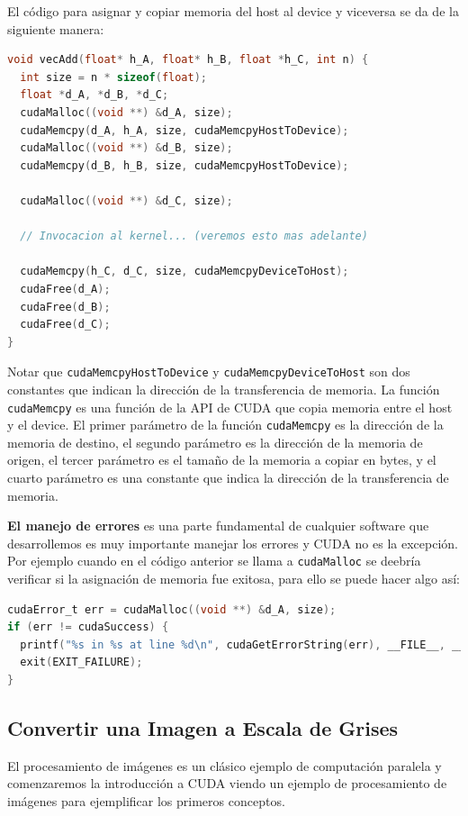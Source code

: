 El código para asignar y copiar memoria del host al device y viceversa se da de la siguiente manera:

\begin{lstlisting}[language=C]
void vecAdd(float* h_A, float* h_B, float *h_C, int n) {
  int size = n * sizeof(float);
  float *d_A, *d_B, *d_C;
  cudaMalloc((void **) &d_A, size);
  cudaMemcpy(d_A, h_A, size, cudaMemcpyHostToDevice);
  cudaMalloc((void **) &d_B, size);
  cudaMemcpy(d_B, h_B, size, cudaMemcpyHostToDevice);

  cudaMalloc((void **) &d_C, size);

  // Invocacion al kernel... (veremos esto mas adelante)

  cudaMemcpy(h_C, d_C, size, cudaMemcpyDeviceToHost);
  cudaFree(d_A);
  cudaFree(d_B);
  cudaFree(d_C);
}
\end{lstlisting}

Notar que \texttt{cudaMemcpyHostToDevice} y \texttt{cudaMemcpyDeviceToHost} son dos constantes que indican la dirección
de la transferencia de memoria. La función \texttt{cudaMemcpy} es una función de la API de CUDA que copia memoria entre
el host y el device. El primer parámetro de la función \texttt{cudaMemcpy} es la dirección de la memoria de destino, el
segundo parámetro es la dirección de la memoria de origen, el tercer parámetro es el tamaño de la memoria a copiar en
bytes, y el cuarto parámetro es una constante que indica la dirección de la transferencia de memoria.

\textbf{El manejo de errores} es una parte fundamental de cualquier software que desarrollemos es muy importante manejar
los errores y CUDA no es la excepción. Por ejemplo cuando en el código anterior se llama a \texttt{cudaMalloc} se
deebría verificar si la asignación de memoria fue exitosa, para ello se puede hacer algo así:

\begin{lstlisting}[language=C]
cudaError_t err = cudaMalloc((void **) &d_A, size);
if (err != cudaSuccess) {
  printf("%s in %s at line %d\n", cudaGetErrorString(err), __FILE__, __LINE__);
  exit(EXIT_FAILURE);
}
\end{lstlisting}

\subsection{Convertir una Imagen a Escala de Grises}

El procesamiento de imágenes es un clásico ejemplo de computación paralela y comenzaremos la introducción a CUDA viendo
un ejemplo de procesamiento de imágenes para ejemplificar los primeros conceptos.

